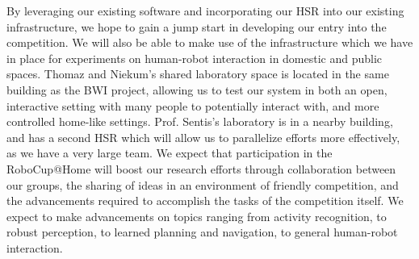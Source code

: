 By leveraging our existing software and incorporating our HSR into our existing infrastructure, we hope to gain a jump start in developing our entry into the competition. We will also be able to make use of the infrastructure which we have in place for experiments on human-robot interaction in domestic and public spaces. Thomaz and Niekum's shared laboratory space is located in the same building as the BWI project, allowing us to test our system in both an open, interactive setting with many people to potentially interact with, and more controlled home-like settings. Prof. Sentis's laboratory is in a nearby building, and has a second HSR which will allow us to parallelize efforts more effectively, as we have a very large team. We expect that participation in the RoboCup@Home will boost our research efforts through collaboration between our groups, the sharing of ideas in an environment of friendly competition, and the advancements required to accomplish the tasks of the competition itself. We expect to make advancements on topics ranging from activity recognition, to robust perception, to learned planning and navigation, to general human-robot interaction.



